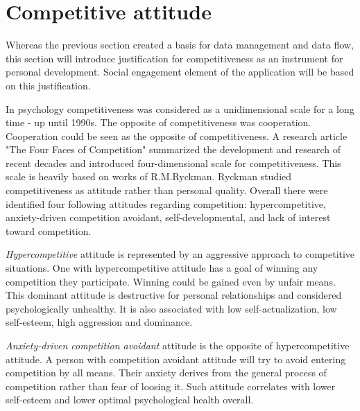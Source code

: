 
\section{Competitive attitude}\label{sec:competitive-attitude}



Whereas the previous section created a basis for data management and data flow,
this section will introduce justification for competitiveness as an instrument for personal development.
Social engagement element of the application will be based on this justification.

In psychology competitiveness was considered as a unidimensional scale for a long time - up until 1990s.
The opposite of competitiveness was cooperation.
Cooperation could be seen as the opposite of competitiveness.
A research article "The Four Faces of Competition" summarized the development and research of recent decades
and introduced four-dimensional scale for competitiveness.\cite{the-four-faces-of-competetition}
This scale is heavily based on works of R.M.Ryckman.\cite{cit-ryckman-hca}\cite{cit-ryckman-adca}\cite{cit-ryckman-pdca}
Ryckman studied competitiveness as attitude rather than personal quality.
Overall there were identified four following attitudes regarding competition:
hypercompetitive, anxiety-driven competition avoidant, self-developmental, and lack of interest toward competition.

\textit{Hypercompetitive} attitude is represented by an aggressive approach to competitive situations.
One with hypercompetitive attitude has a goal of winning any competition they participate.
Winning could be gained even by unfair means.
This dominant attitude is destructive for personal relationships and considered psychologically unhealthy.
It is also associated with low self-actualization, low self-esteem, high aggression and dominance.\cite{cit-ryckman-hca}

\textit{Anxiety-driven competition avoidant} attitude is the opposite of hypercompetitive attitude.
A person with competition avoidant attitude will try to avoid entering competition by all means.
Their anxiety derives from the general process of competition rather than fear of loosing it.
Such attitude correlates with lower self-esteem and lower optimal psychological health overall.\cite{cit-ryckman-adca}

